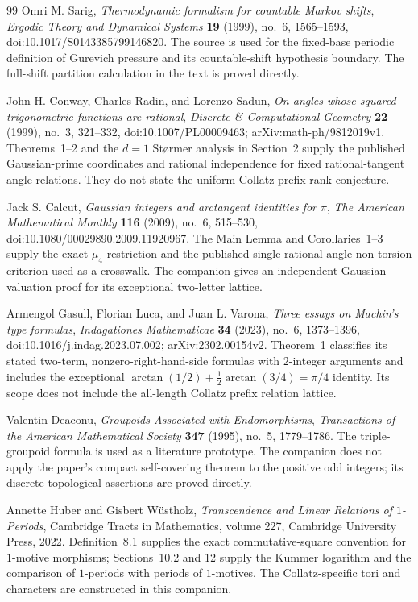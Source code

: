 \begin{thebibliography}{99}
Omri M. Sarig,
\emph{Thermodynamic formalism for countable Markov shifts},
\emph{Ergodic Theory and Dynamical Systems} \textbf{19} (1999), no.~6,
1565--1593, doi:10.1017/S0143385799146820.
The source is used for the fixed-base periodic definition of Gurevich
pressure and its countable-shift hypothesis boundary.  The full-shift
partition calculation in the text is proved directly.

John H. Conway, Charles Radin, and Lorenzo Sadun,
\emph{On angles whose squared trigonometric functions are rational},
\emph{Discrete \& Computational Geometry} \textbf{22} (1999), no.~3,
321--332, doi:10.1007/PL00009463; arXiv:math-ph/9812019v1.
Theorems~1--2 and the $d=1$ St\o rmer analysis in Section~2 supply the
published Gaussian-prime coordinates and rational independence for fixed
rational-tangent angle relations.  They do not state the uniform Collatz
prefix-rank conjecture.

Jack S. Calcut,
\emph{Gaussian integers and arctangent identities for $\pi$},
\emph{The American Mathematical Monthly} \textbf{116} (2009), no.~6,
515--530, doi:10.1080/00029890.2009.11920967.
The Main Lemma and Corollaries~1--3 supply the exact $\mu_4$ restriction and
the published single-rational-angle non-torsion criterion used as a
crosswalk.  The companion gives an independent Gaussian-valuation proof for
its exceptional two-letter lattice.

Armengol Gasull, Florian Luca, and Juan L. Varona,
\emph{Three essays on Machin's type formulas},
\emph{Indagationes Mathematicae} \textbf{34} (2023), no.~6, 1373--1396,
doi:10.1016/j.indag.2023.07.002; arXiv:2302.00154v2.
Theorem~1 classifies its stated two-term, nonzero-right-hand-side formulas
with $2$-integer arguments and includes the exceptional
$\arctan(1/2)+\tfrac12\arctan(3/4)=\pi/4$ identity.  Its scope does not
include the all-length Collatz prefix relation lattice.

Valentin Deaconu,
\emph{Groupoids Associated with Endomorphisms},
\emph{Transactions of the American Mathematical Society} \textbf{347}
(1995), no.~5, 1779--1786.
The triple-groupoid formula is used as a literature prototype.  The
companion does not apply the paper's compact self-covering theorem to the
positive odd integers; its discrete topological assertions are proved
directly.

Annette Huber and Gisbert W\"ustholz,
\emph{Transcendence and Linear Relations of $1$-Periods},
Cambridge Tracts in Mathematics, volume 227, Cambridge University Press,
2022.
Definition~8.1 supplies the exact commutative-square convention for
$1$-motive morphisms; Sections~10.2 and 12 supply the Kummer logarithm and
the comparison of $1$-periods with periods of $1$-motives.  The
Collatz-specific tori and characters are constructed in this companion.


\end{thebibliography}
